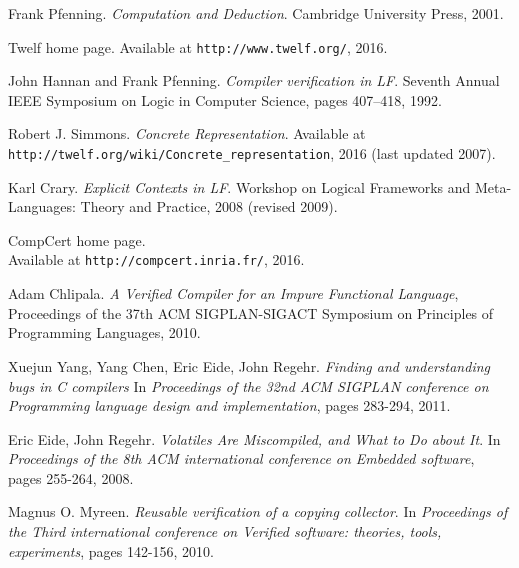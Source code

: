 \clearpage

\begin{thebibliography}{99}

Frank Pfenning.
\textit{Computation and Deduction}.
Cambridge University Press, 2001.

Twelf home page. Available at \texttt{http://www.twelf.org/}, 2016.

John Hannan and Frank Pfenning.
\textit{Compiler verification in LF}.
Seventh Annual IEEE Symposium on Logic in Computer Science, pages 407–418, 1992.

Robert J. Simmons.
\textit{Concrete Representation}.
Available at \texttt{http://twelf.org/wiki/Concrete\_representation}, 2016 (last updated 2007).

Karl Crary.
\textit{Explicit Contexts in LF}.
Workshop on Logical Frameworks and Meta-Languages: Theory and Practice, 2008 (revised 2009).

CompCert home page. \\
Available at \texttt{http://compcert.inria.fr/}, 2016.

Adam Chlipala.
\textit{A Verified Compiler for an Impure Functional Language},
Proceedings of the 37th ACM SIGPLAN-SIGACT Symposium on Principles of Programming Languages, 2010.

Xuejun Yang, Yang Chen, Eric Eide, John Regehr.
\textit{Finding and understanding bugs in C compilers}
In \textit{Proceedings of the 32nd ACM SIGPLAN conference on Programming language design and implementation}, pages 283-294, 2011.

Eric Eide, John Regehr.
\textit{Volatiles Are Miscompiled, and What to Do about It}.
In \textit{Proceedings of the 8th ACM international conference on Embedded software}, pages 255-264, 2008.

Magnus O. Myreen.
\textit{Reusable verification of a copying collector}.
In \textit{Proceedings of the Third international conference on Verified software: theories, tools, experiments}, pages 142-156, 2010.

\end{thebibliography}
